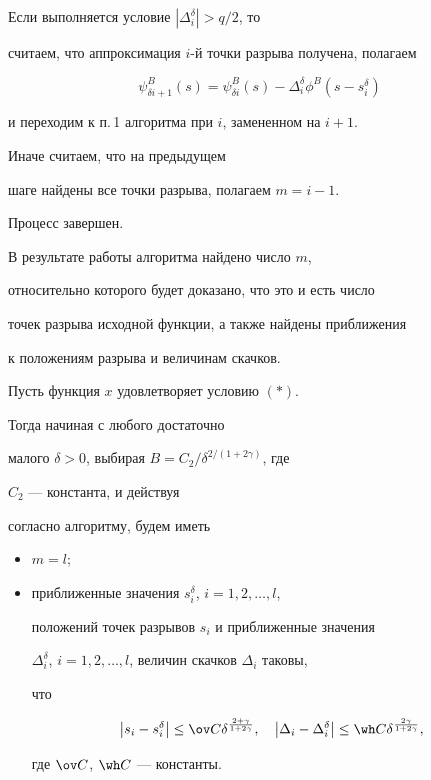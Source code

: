 Если выполняется условие $|\Delta_i^\delta| > q/2$, то


считаем, что аппроксимация $i$-й точки разрыва получена, полагаем


$$


\psi^B_{\delta i+1}(s)=\psi^B_{\delta i} (s)


-\Delta_{i}^\delta\phi^B(s-s_{i}^\delta)


$$


и переходим к п.\,1 алгоритма при $i$, замененном на $i+1$.


Иначе считаем, что на предыдущем


шаге найдены все точки разрыва, полагаем $m=i-1$.


Процесс завершен.





В результате работы алгоритма найдено число $m$,


относительно которого будет доказано, что это и есть число


точек разрыва исходной функции, а также найдены приближения


к положениям разрыва и величинам скачков.





\begin{thm}


Пусть функция $x$ удовлетворяет условию $(*)$.


Тогда начиная с любого достаточно


малого $\delta>0$, выбирая $B=C_2/\delta^{2/(1+2\gamma)}$, где


$C_2$ --- константа, и действуя


согласно алгоритму, будем иметь


\begin{itemize}


\item[1)] $m=l;$


\item[2)] приближенные значения $s_i^\delta$, $i=1,2,\dotsc,l$,


положений точек разрывов $s_i$ и приближенные значения


$\Delta_i^\delta$, $i=1,2,\dotsc,l$, величин скачков $\Delta_i$ таковы,


что


$$


\Mod{s_i-s_i^\delta}\leq \ov C \delta^{\frac{2+\gamma}{1+2\gamma}},


\quad


\Mod{\Delta_i-\Delta_i^\delta}\leq\wh C


\delta^{\frac{2\gamma}{1+2\gamma}},


$$


где $\ov C$, $\wh C$ --- константы.


\end{itemize}


\end{thm}





